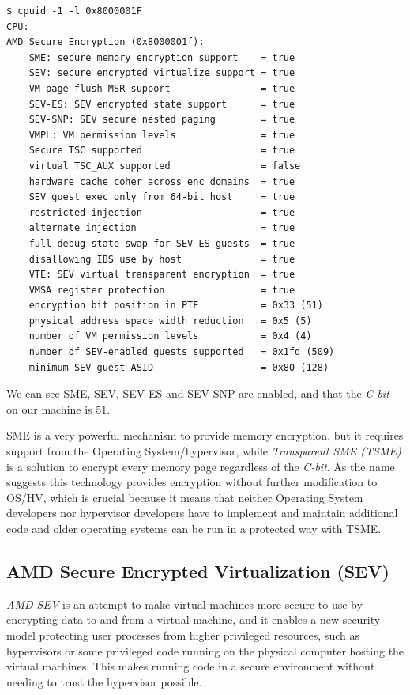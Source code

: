 \documentclass[twocolumn]{article}
\begin{document}
\begin{verbatim}
$ cpuid -1 -l 0x8000001F
CPU:
AMD Secure Encryption (0x8000001f):
    SME: secure memory encryption support    = true
    SEV: secure encrypted virtualize support = true
    VM page flush MSR support                = true
    SEV-ES: SEV encrypted state support      = true
    SEV-SNP: SEV secure nested paging        = true
    VMPL: VM permission levels               = true
    Secure TSC supported                     = true
    virtual TSC_AUX supported                = false
    hardware cache coher across enc domains  = true
    SEV guest exec only from 64-bit host     = true
    restricted injection                     = true
    alternate injection                      = true
    full debug state swap for SEV-ES guests  = true
    disallowing IBS use by host              = true
    VTE: SEV virtual transparent encryption  = true
    VMSA register protection                 = true
    encryption bit position in PTE           = 0x33 (51)
    physical address space width reduction   = 0x5 (5)    
    number of VM permission levels           = 0x4 (4)
    number of SEV-enabled guests supported   = 0x1fd (509)
    minimum SEV guest ASID                   = 0x80 (128)
\end{verbatim}

We can see SME, SEV, SEV-ES and SEV-SNP are enabled, and that the \textit{C-bit} on our machine is 51.

SME is a very powerful mechanism to provide memory encryption, but it requires support from the Operating System/hypervisor, while \textit{Transparent SME (TSME)} is a solution to encrypt every memory page regardless of the \textit{C-bit}. As the name suggests this technology provides encryption without further modification to OS/HV, which is crucial because it means that neither Operating System developers nor hypervisor developers have to implement and maintain additional code and older operating systems can be run in a protected way with TSME.

\subsection{AMD Secure Encrypted Virtualization (SEV)}

\textit{AMD SEV} is an attempt to make virtual machines more secure to use by encrypting data to and from a virtual machine, and it enables a new security model protecting user processes from higher privileged resources, such as hypervisors or some privileged code running on the physical computer hosting the virtual machines. This makes running code in a secure environment without needing to trust the hypervisor possible.
\end{document}
